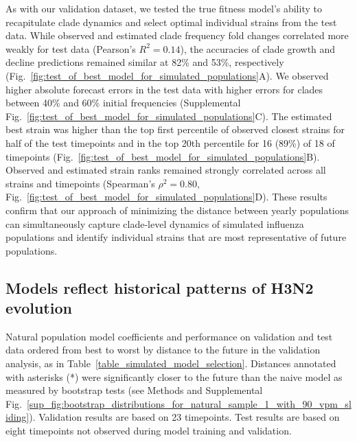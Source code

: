 As with our validation dataset, we tested the true fitness model's ability to recapitulate clade dynamics and select optimal individual strains from the test data.
While observed and estimated clade frequency fold changes correlated more weakly for test data (Pearson's $R^2 = 0.14$), the accuracies of clade growth and decline predictions remained similar at 82\% and 53\%, respectively (Fig.~\ref{fig:test_of_best_model_for_simulated_populations}A).
We observed higher absolute forecast errors in the test data with higher errors for clades between 40\% and 60\% initial frequencies (Supplemental Fig.~\ref{fig:test_of_best_model_for_simulated_populations}C).
The estimated best strain was higher than the top first percentile of observed closest strains for half of the test timepoints and in the top 20th percentile for 16 (89\%) of 18 of timepoints (Fig.~\ref{fig:test_of_best_model_for_simulated_populations}B).
Observed and estimated strain ranks remained strongly correlated across all strains and timepoints (Spearman's $\rho^2 = 0.80$, Fig.~\ref{fig:test_of_best_model_for_simulated_populations}D).
These results confirm that our approach of minimizing the distance between yearly populations can simultaneously capture clade-level dynamics of simulated influenza populations and identify individual strains that are most representative of future populations.

\subsection*{Models reflect historical patterns of H3N2 evolution}

\begin{table}[htb]
  \begin{center}
    \scalebox{0.9}{
      
    }
    \caption{
      Natural population model coefficients and performance on validation and test data ordered from best to worst by distance to the future in the validation analysis, as in Table~\ref{table_simulated_model_selection}.
      Distances annotated with asterisks (*) were significantly closer to the future than the naive model as measured by bootstrap tests (see Methods and Supplemental Fig.~\ref{sup_fig:bootstrap_distributions_for_natural_sample_1_with_90_vpm_sliding}).
      Validation results are based on 23 timepoints.
      Test results are based on eight timepoints not observed during model training and validation.
    }
    \label{table_natural_model_selection}
  \end{center}
\end{table}

